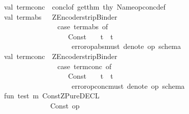 \begin{isabellebody}
\ \ \ \ \ \ \ \ \ \ \ val\ term{\isacharunderscore}conc\ {\isacharequal}\ concl{\isacharunderscore}of\ {\isacharparenleft}get{\isacharunderscore}thm\ thy\ {\isacharparenleft}Name{\isacharparenleft}op{\isacharunderscore}conc{\isacharcircum}{\isachardoublequote}{\isacharunderscore}def{\isachardoublequote}{\isacharparenright}{\isacharparenright}{\isacharparenright}\ \isanewline
\ \ \ \ \ \ \ \ \ \ \ val\ term{\isacharunderscore}abs\ \ {\isacharequal}\ ZEncoder{\isachardot}strip{\isacharunderscore}Binder\isanewline
\ \ \ \ \ \ \ \ \ \ \ \ \ \ \ \ \ \ \ \ \ \ \ \ \ \ {\isacharparenleft}case\ term{\isacharunderscore}abs\ of\isanewline
\ \ \ \ \ \ \ \ \ \ \ \ \ \ \ \ \ \ \ \ \ \ \ \ \ \ \ \ \ Const{\isacharparenleft}{\isachardoublequote}{\isacharequal}{\isacharequal}{\isachardoublequote}{\isacharcomma}{\isacharunderscore}{\isacharparenright}\ {\isachardollar}\ {\isacharunderscore}\ {\isachardollar}\ t\ {\isacharequal}{\isachargreater}\ t\isanewline
\ \ \ \ \ \ \ \ \ \ \ \ \ \ \ \ \ \ \ \ \ \ \ \ \ \ \ {\isacharbar}\ {\isacharunderscore}\ {\isacharequal}{\isachargreater}\ error{\isacharparenleft}op{\isacharunderscore}abs{\isacharcircum}{\isachardoublequote}must\ denote\ op\ schema{\isacharbang}{\isachardoublequote}{\isacharparenright}{\isacharparenright}\isanewline
\ \ \ \ \ \ \ \ \ \ \ val\ term{\isacharunderscore}conc\ {\isacharequal}\ ZEncoder{\isachardot}strip{\isacharunderscore}Binder\isanewline
\ \ \ \ \ \ \ \ \ \ \ \ \ \ \ \ \ \ \ \ \ \ \ \ \ \ {\isacharparenleft}case\ term{\isacharunderscore}conc\ of\isanewline
\ \ \ \ \ \ \ \ \ \ \ \ \ \ \ \ \ \ \ \ \ \ \ \ \ \ \ \ \ Const{\isacharparenleft}{\isachardoublequote}{\isacharequal}{\isacharequal}{\isachardoublequote}{\isacharcomma}{\isacharunderscore}{\isacharparenright}\ {\isachardollar}\ {\isacharunderscore}\ {\isachardollar}\ t\ {\isacharequal}{\isachargreater}\ t\isanewline
\ \ \ \ \ \ \ \ \ \ \ \ \ \ \ \ \ \ \ \ \ \ \ \ \ \ \ {\isacharbar}\ {\isacharunderscore}\ {\isacharequal}{\isachargreater}\ error{\isacharparenleft}op{\isacharunderscore}conc{\isacharcircum}{\isachardoublequote}must\ denote\ op\ schema{\isacharbang}{\isachardoublequote}{\isacharparenright}{\isacharparenright}\isanewline
\ \ \ \ \ \ \ \ \ \ \ fun\ test\ m\ {\isacharparenleft}Const{\isacharparenleft}{\isachardoublequote}ZPure{\isachardot}DECL{\isachardoublequote}{\isacharcomma}{\isacharunderscore}{\isacharparenright}\ {\isachardollar}\isanewline
\ \ \ \ \ \ \ \ \ \ \ \ \ \ \ \ \ \ \ \ \ \ \ \ {\isacharparenleft}Const\ {\isacharparenleft}{\isachardoublequote}op\ {\isacharampersand}{\isachardoublequote}{\isacharcomma}{\isacharunderscore}{\isacharparenright}\ \ \isanewline

\end{isabellebody}

